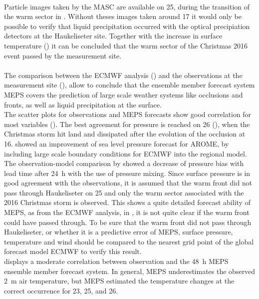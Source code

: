 \\
Particle images taken by the MASC are available on \SI{25}{\dec}, during the transition of the warm sector in . Without theses images taken around \SI{17}{\UTC} it would only be possible to verify that liquid precipitation occurred with the optical precipiation detectors at the Haukeliseter site. Together with the increase in surface temperature () it can be concluded that the warm sector of the Christmas 2016 event passed by the measurement site.
%
\\
\\
The comparison between the ECMWF analysis () and the observations at the measurement site (), allow to conclude that the ensemble member forecast system MEPS covers the prediction of large scale weather systems like occlusions and fronts, as well as liquid precipitation at the surface. 
\\
The scatter plots for observations and MEPS forecasts show good correlation for most variables ().
The best agreement for pressure is reached on \SI{26}{\dec} (), when the Christmas storm hit land and dissipated after the evolution of the occlusion at \SI{16}{\UTC}. \citet{dahlgren_comparison_2013} showed an improvement of sea level pressure forecast for AROME, by including large scale boundary conditions for ECMWF into the regional model. The observation-model comparison by \citet{dahlgren_comparison_2013} showed a decrease of pressure bias with lead time after \SI{24}{\hour} with the use of pressure mixing. 
Since surface pressure is in good agreement with the observations, it is assumed that the warm front did not pass through Haukeliseter on \SI{25}{\dec} and only the warm sector associated with the 2016 Christmas storm is observed. This shows a quite detailed forecast ability of MEPS, as from the ECMWF analysis, in , it is not quite clear if the warm front could have passed through. To be sure that the warm front did not pass through Haukeliseter, or whether it is a predictive error of MEPS, surface pressure, temperature and wind should be compared to the nearest grid point of the global forecast model ECMWF to verify this result.
\\
 displays a moderate correlation between observation and the \SI{48}{\hour} MEPS ensemble member forecast system. In general, MEPS underestimates the observed \SI{2}{\metre} air temperature, but MEPS estimated the temperature changes at the correct occurrence for \num{23}, \num{25}, and \SI{26}{\dec}. 
